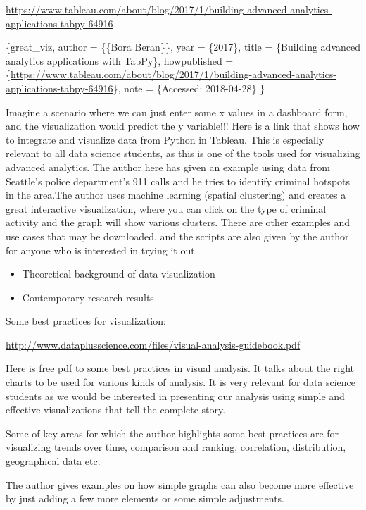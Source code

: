 \documentclass[]{book}
\providecommand{\tightlist}{%
  \setlength{\itemsep}{0pt}\setlength{\parskip}{0pt}}
\theoremstyle{definition}
\theoremstyle{definition}
\theoremstyle{definition}
\theoremstyle{remark}
\begin{document}
\url{https://www.tableau.com/about/blog/2017/1/building-advanced-analytics-applications-tabpy-64916}

\citet{misc}\{great\_viz, author = \{\{Bora Beran\}\}, year = \{2017\},
title = \{Building advanced analytics applications with TabPy\},
howpublished =
\{\url{https://www.tableau.com/about/blog/2017/1/building-advanced-analytics-applications-tabpy-64916}\},
note = \{Accessed: 2018-04-28\} \}

Imagine a scenario where we can just enter some x values in a dashboard
form, and the visualization would predict the y variable!!! Here is a
link that shows how to integrate and visualize data from Python in
Tableau. This is especially relevant to all data science students, as
this is one of the tools used for visualizing advanced analytics. The
author here has given an example using data from Seattle's police
department's 911 calls and he tries to identify criminal hotspots in the
area.The author uses machine learning (spatial clustering) and creates a
great interactive visualization, where you can click on the type of
criminal activity and the graph will show various clusters. There are
other examples and use cases that may be downloaded, and the scripts are
also given by the author for anyone who is interested in trying it out.

\begin{itemize}
\tightlist
\item
  Theoretical background of data visualization
\item
  Contemporary research results
\end{itemize}

Some best practices for visualization:

\url{http://www.dataplusscience.com/files/visual-analysis-guidebook.pdf}

Here is free pdf to some best practices in visual analysis. It talks
about the right charts to be used for various kinds of analysis. It is
very relevant for data science students as we would be interested in
presenting our analysis using simple and effective visualizations that
tell the complete story.

Some of key areas for which the author highlights some best practices
are for visualizing trends over time, comparison and ranking,
correlation, distribution, geographical data etc.

The author gives examples on how simple graphs can also become more
effective by just adding a few more elements or some simple adjustments.
\end{document}
